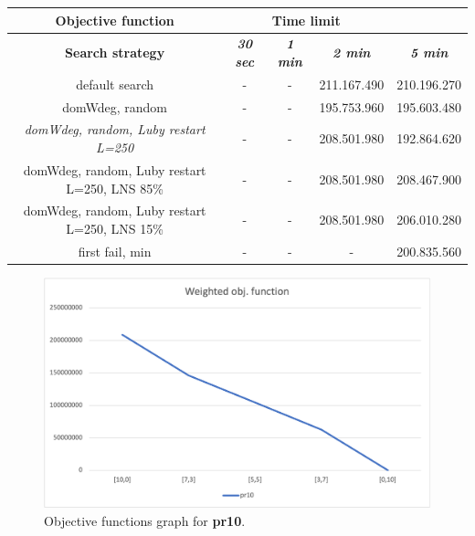 {
\renewcommand{\arraystretch}{2}
\begin{longtable}[h]{| c | c | c | c | c |}
    \hline
    \textbf{Objective function} & \multicolumn{3}{c}{Time limit} & \\
    \hline
    \textbf{Search strategy} & \textbf{\textit{30 sec}} & \textbf{\textit{1 min}} & \textbf{\textit{2 min}} & \textbf{\textit{5 min}} \\
    \hline
    \endhead
    default search                                & - & - & 211.167.490 & 210.196.270 \\
    \hline
    domWdeg, random                               & - & - & 195.753.960 & 195.603.480 \\
    \hline
    \textit{domWdeg, random, Luby restart L=250}  & - & - & 208.501.980 & 192.864.620 \\
    \hline
    domWdeg, random, Luby restart L=250, LNS 85\% & - & - & 208.501.980 & 208.467.900 \\
    \hline
    domWdeg, random, Luby restart L=250, LNS 15\% & - & - & 208.501.980 & 206.010.280 \\
    \hline
    first fail, min                               & - & - &         - & 200.835.560 \\
    \hline
\end{longtable}
}
\begin{figure}[H]
    \centering
    \includegraphics[width=0.8\columnwidth]{../graphs/pr10-wobjf.png}
    \caption{Objective functions graph for \textbf{pr10}.}
\end{figure}

